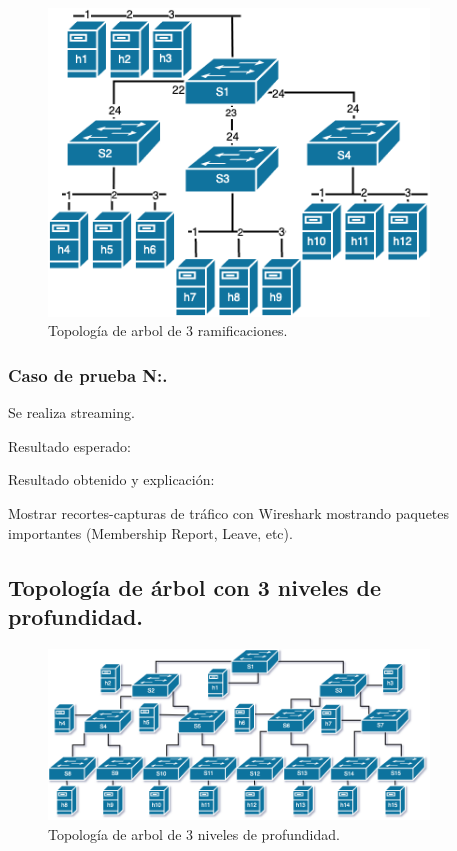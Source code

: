 \documentclass[12pt,a4paper,oneside]{book}
\begin{document}
\begin{figure}[ht]
 \centering
 \includegraphics[width=0.9\textwidth]{fotos/5_Pruebas/2_topo_arbol/3ramas.png}
 \caption{Topología de arbol de 3 ramificaciones.}
 \label{topo_arbol_3_ramas}
\end{figure}

\subsubsection{Caso de prueba N:.} 
Se realiza streaming.

\vspace{0.5cm}
Resultado esperado: 

\vspace{0.5cm}
Resultado obtenido y explicación: 

\vspace{0.5cm}
Mostrar recortes-capturas de tráfico con Wireshark mostrando paquetes importantes (Membership Report, Leave, etc).




\subsection{Topología de árbol con 3 niveles de profundidad.}

\begin{figure}[ht]
 \centering
 \includegraphics[width=0.9\textwidth]{fotos/5_Pruebas/2_topo_arbol/3niveles.png}
 \caption{Topología de arbol de 3 niveles de profundidad.}
 \label{topo_arbol_3_niveles}
\end{figure}
\end{document}
